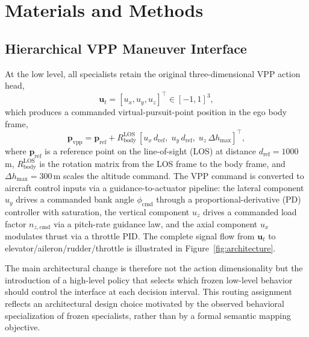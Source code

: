 \documentclass[5p,times]{elsarticle} %
\begin{document}
\section{Materials and Methods}

\subsection{Hierarchical VPP Maneuver Interface}
\label{subsec:hierarchical_interface}

At the low level, all specialists retain the original three-dimensional VPP action head,
\begin{equation}
\mathbf{u}_t = [u_x, u_y, u_z]^\top \in [-1,1]^3,
\end{equation}
which produces a commanded virtual-pursuit-point position in the ego body frame,
\begin{equation}
\mathbf{p}_{\text{vpp}} = \mathbf{p}_{\text{ref}} + R_{\text{body}}^{\text{LOS}} \, [u_x \, d_{\text{ref}},\; u_y \, d_{\text{ref}},\; u_z \, \Delta h_{\text{max}}]^\top,
\end{equation}
where $\mathbf{p}_{\text{ref}}$ is a reference point on the line-of-sight (LOS) at distance $d_{\text{ref}} = 1000$\,m, $R_{\text{body}}^{\text{LOS}}$ is the rotation matrix from the LOS frame to the body frame, and $\Delta h_{\text{max}} = 300$\,m scales the altitude command. The VPP command is converted to aircraft control inputs via a guidance-to-actuator pipeline: the lateral component $u_y$ drives a commanded bank angle $\phi_{\text{cmd}}$ through a proportional-derivative (PD) controller with saturation, the vertical component $u_z$ drives a commanded load factor $n_{z,\text{cmd}}$ via a pitch-rate guidance law, and the axial component $u_x$ modulates thrust via a throttle PID. The complete signal flow from $\mathbf{u}_t$ to elevator/aileron/rudder/throttle is illustrated in Figure~\ref{fig:architecture}.

The main architectural change is therefore not the action dimensionality but the introduction of a high-level policy that selects which frozen low-level behavior should control the interface at each decision interval. This routing assignment reflects an architectural design choice motivated by the observed behavioral specialization of frozen specialists, rather than by a formal semantic mapping objective.
\end{document}
